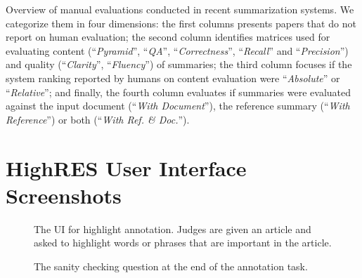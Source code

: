 \documentclass[11pt,a4paper]{article}
\begin{document}
\begin{table}[h]
\caption{Overview of manual evaluations conducted in recent summarization systems. We categorize them in four dimensions: the first columns presents papers that do not report on human evaluation; the second column identifies matrices used for evaluating content (``\textit{Pyramid}'', ``\textit{QA}'', ``\textit{Correctness}'', ``\textit{Recall}'' and ``\textit{Precision}'') and quality (``\textit{Clarity}'', ``\textit{Fluency}'') of summaries; the third column focuses if the system ranking reported by humans on content evaluation were ``\textit{Absolute}'' or ``\textit{Relative}''; and finally, the fourth column evaluates if summaries were evaluated against the input document (``\textit{With Document}''), the reference summary (``\textit{With Reference}'') or both (``\textit{With Ref. \& Doc.}'').}
\end{table}
\newpage
\section{HighRES User Interface Screenshots}
\begin{figure}[h]
    \centering
    \caption{The UI for highlight annotation. Judges are given an article and asked to highlight words or phrases that are important in the article.}
\end{figure}
\begin{figure}[h]
    \centering
    \caption{The sanity checking question at the end of the annotation task.}
\end{figure}
\end{document}
